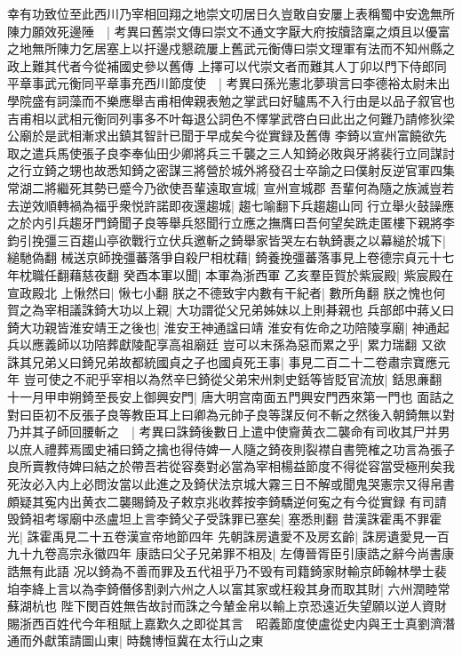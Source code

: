幸有功致位至此西川乃宰相回翔之地崇文叨居日久豈敢自安屢上表稱蜀中安逸無所陳力願效死邊陲　|{
	考異曰舊崇文傳曰崇文不通文字厭大府按牘諮稟之煩且以優富之地無所陳力乞居塞上以扞邊戍懇疏屢上舊武元衡傳曰崇文理軍有法而不知州縣之政上難其代者今從補國史參以舊傳}
上擇可以代崇文者而難其人丁卯以門下侍郎同平章事武元衡同平章事充西川節度使　|{
	考異曰孫光憲北夢瑣言曰李德裕太尉未出學院盛有詞藻而不樂應舉吉甫相俾親表勉之掌武曰好驢馬不入行由是以品子叙官也吉甫相以武相元衡同列事多不叶每退公詞色不懌掌武啓白曰此出之何難乃請修狄梁公廟於是武相漸求出鎮其智計已聞于早成矣今從實録及舊傳}
李錡以宣州富饒欲先取之遣兵馬使張子良李奉仙田少卿將兵三千襲之三人知錡必敗與牙將裴行立同謀討之行立錡之甥也故悉知錡之密謀三將營於城外將發召士卒諭之曰僕射反逆官軍四集常湖二將繼死其勢已蹙今乃欲使吾輩遠取宣城|{
	宣州宣城郡}
吾輩何為隨之族滅豈若去逆效順轉禍為福乎衆悦許諾即夜還趨城|{
	趨七喻翻下兵趨趨山同}
行立舉火鼓譟應之於内引兵趨牙門錡聞子良等舉兵怒聞行立應之撫膺曰吾何望矣跣走匿樓下親將李鈞引挽彊三百趨山亭欲戰行立伏兵邀斬之錡舉家皆哭左右執錡裹之以幕縋於城下|{
	縋馳偽翻}
械送京師挽彊蕃落爭自殺尸相枕藉|{
	錡養挽彊蕃落事見上卷德宗貞元十七年枕職任翻藉慈夜翻}
癸酉本軍以聞|{
	本軍為浙西軍}
乙亥羣臣賀於紫宸殿|{
	紫宸殿在宣政殿北}
上愀然曰|{
	愀七小翻}
朕之不德致宇内數有干紀者|{
	數所角翻}
朕之愧也何賀之為宰相議誅錡大功以上親|{
	大功謂從父兄弟姊妹以上則朞親也}
兵部郎中蔣乂曰錡大功親皆淮安靖王之後也|{
	淮安王神通諡曰靖}
淮安有佐命之功陪陵享廟|{
	神通起兵以應義師以功陪葬獻陵配享高祖廟廷}
豈可以末孫為惡而累之乎|{
	累力瑞翻}
又欲誅其兄弟乂曰錡兄弟故都統國貞之子也國貞死王事|{
	事見二百二十二卷肅宗寶應元年}
豈可使之不祀乎宰相以為然辛巳錡從父弟宋州刺史銛等皆貶官流放|{
	銛思亷翻}
十一月甲申朔錡至長安上御興安門|{
	唐大明宫南面五門興安門西來第一門也}
面詰之對曰臣初不反張子良等教臣耳上曰卿為元帥子良等謀反何不斬之然後入朝錡無以對乃并其子師回腰斬之　|{
	考異曰誅錡後數日上遣中使齎黄衣二襲命有司收其尸并男以庶人禮葬焉國史補曰錡之擒也得侍婢一人隨之錡夜則裂襟自書筦榷之功言為張子良所賣教侍婢曰結之於帶吾若從容奏對必當為宰相楊益節度不得從容當受極刑矣我死汝必入内上必問汝當以此進之及錡伏法京城大霧三日不解或聞鬼哭憲宗又得帛書頗疑其寃内出黄衣二襲賜錡及子敕京兆收葬按李錡驕逆何寃之有今從實録}
有司請毁錡祖考塜廟中丞盧坦上言李錡父子受誅罪已塞矣|{
	塞悉則翻}
昔漢誅霍禹不罪霍光|{
	誅霍禹見二十五卷漢宣帝地節四年}
先朝誅房遺愛不及房玄齡|{
	誅房遺愛見一百九十九卷高宗永徽四年}
康誥曰父子兄弟罪不相及|{
	左傳晉胥臣引康誥之辭今尚書康誥無有此語}
况以錡為不善而罪及五代祖乎乃不毁有司籍錡家財輸京師翰林學士裴垍李絳上言以為李錡僭侈割剥六州之人以富其家或枉殺其身而取其財|{
	六州潤睦常蘇湖杭也}
陛下閔百姓無告故討而誅之今輦金帛以輸上京恐遠近失望願以逆人資財賜浙西百姓代今年租賦上嘉歎久之即從其言　昭義節度使盧從史内與王士真劉濟潛通而外獻策請圖山東|{
	時魏博恒冀在太行山之東}
